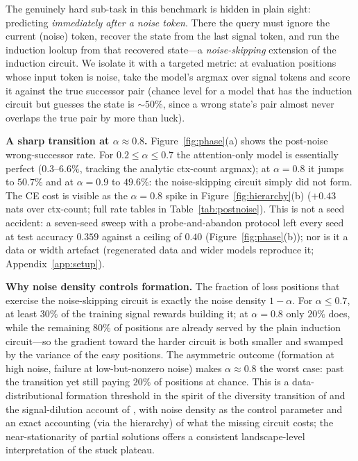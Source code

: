 \documentclass{article} %
\newcommand{\ctxcount}{\textsf{ctx-count}}
\begin{document}
The genuinely hard sub-task in this benchmark is hidden in plain sight: predicting
\emph{immediately after a noise token}. There the query must ignore the current
(noise) token, recover the state from the last signal token, and run the induction
lookup from that recovered state---a \emph{noise-skipping} extension of the induction
circuit. We isolate it with a targeted metric: at evaluation positions whose input
token is noise, take the model's argmax over signal tokens and score it against the
true successor pair (chance level for a model that has the induction circuit but
guesses the state is ${\sim}50\%$, since a wrong state's pair almost never overlaps
the true pair by more than luck).

\textbf{A sharp transition at $\alpha\approx0.8$.} Figure~\ref{fig:phase}(a) shows
the post-noise wrong-successor rate. For $0.2\le\alpha\le0.7$ the attention-only
model is essentially perfect ($0.3$--$6.6\%$, tracking the analytic \ctxcount{}
argmax); at $\alpha=0.8$ it jumps to $50.7\%$ and at $\alpha=0.9$ to $49.6\%$: the
noise-skipping circuit simply did not form. The CE cost is visible as the
$\alpha=0.8$ spike in Figure~\ref{fig:hierarchy}(b) ($+0.43$ nats over \ctxcount{};
full rate tables in Table~\ref{tab:postnoise}).
This is not a seed accident: a seven-seed sweep with a probe-and-abandon protocol
left every seed at test accuracy $0.359$ against a ceiling of $0.40$
(Figure~\ref{fig:phase}(b)); nor is it a data or width artefact (regenerated data
and wider models reproduce it; Appendix~\ref{app:setup}).

\textbf{Why noise density controls formation.} The fraction of loss positions that
exercise the noise-skipping circuit is exactly the noise density $1-\alpha$. For
$\alpha\le0.7$, at least $30\%$ of the training signal rewards building it; at
$\alpha=0.8$ only $20\%$ does, while the remaining $80\%$ of positions are already
served by the plain induction circuit---so the gradient toward the harder circuit is
both smaller and swamped by the variance of the easy positions. The asymmetric
outcome (formation at high noise, failure at low-but-nonzero noise) makes
$\alpha\approx0.8$ the worst case: past the transition yet still paying $20\%$ of
positions at chance. This is a data-distributional formation threshold in the spirit
of the diversity transition of \citet{kawata2025shortcut} and the signal-dilution
account of \citet{zucchet2025emergence}, with noise density as the control parameter
and an exact accounting (via the hierarchy) of what the missing circuit costs; the
near-stationarity of partial solutions \citep{varre2025learning,makkuva2024local}
offers a consistent landscape-level interpretation of the stuck plateau.
\end{document}
